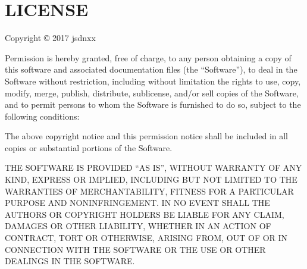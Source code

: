 \chapter{LICENSE}
\hypertarget{md__tele-website_2node__modules_2find-root_2_l_i_c_e_n_s_e}{}\label{md__tele-website_2node__modules_2find-root_2_l_i_c_e_n_s_e}
Copyright © 2017 jsdnxx

Permission is hereby granted, free of charge, to any person obtaining a copy of this software and associated documentation files (the “\+Software”), to deal in the Software without restriction, including without limitation the rights to use, copy, modify, merge, publish, distribute, sublicense, and/or sell copies of the Software, and to permit persons to whom the Software is furnished to do so, subject to the following conditions\+:

The above copyright notice and this permission notice shall be included in all copies or substantial portions of the Software.

THE SOFTWARE IS PROVIDED “\+AS IS”, WITHOUT WARRANTY OF ANY KIND, EXPRESS OR IMPLIED, INCLUDING BUT NOT LIMITED TO THE WARRANTIES OF MERCHANTABILITY, FITNESS FOR A PARTICULAR PURPOSE AND NONINFRINGEMENT. IN NO EVENT SHALL THE AUTHORS OR COPYRIGHT HOLDERS BE LIABLE FOR ANY CLAIM, DAMAGES OR OTHER LIABILITY, WHETHER IN AN ACTION OF CONTRACT, TORT OR OTHERWISE, ARISING FROM, OUT OF OR IN CONNECTION WITH THE SOFTWARE OR THE USE OR OTHER DEALINGS IN THE SOFTWARE. 
